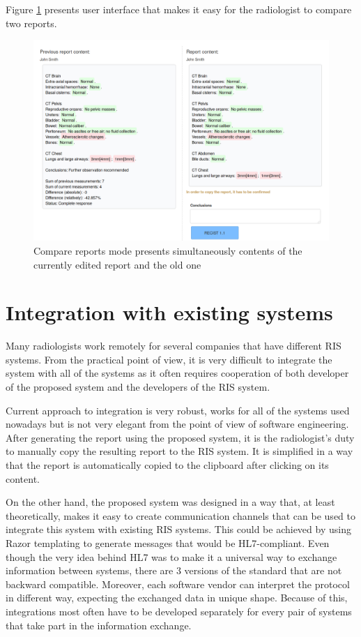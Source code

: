 \documentclass[12pt, twoside, openany]{report}
\theoremstyle{definition}
\begin{document}
Figure \ref{fig:compare-report} presents user interface that makes it easy for the radiologist to compare two reports.

\begin{figure}
	\centering
	\includegraphics[width=\linewidth]{compare-reports}
	\caption{Compare reports mode presents simultaneously contents of the currently edited report and the old one
		\label{fig:compare-report}
	}
\end{figure}

\section{Integration with existing systems}
Many radiologists work remotely for several companies that have different RIS systems. From the practical point of view, it is very difficult to integrate the system with all of the systems as it often requires cooperation of both developer of the proposed system and the developers of the RIS system. 

Current approach to integration is very robust, works for all of the systems used nowadays but is not very elegant from the point of view of software engineering. 
After generating the report using the proposed system, it is the radiologist's duty to manually copy the resulting report to the RIS system. It is simplified in a way that the report is automatically copied to the clipboard after clicking on its content.

On the other hand, the proposed system was designed in a way that, at least theoretically, makes it easy to create communication channels that can be used to integrate this system with existing RIS systems. This could be achieved by using Razor templating to generate messages that would be HL7-compliant. Even though the very idea behind HL7 was to make it a universal way to exchange information between systems, there are 3 versions of the standard that are not backward compatible. Moreover, each software vendor can interpret the protocol in different way, expecting the exchanged data in unique shape. Because of this, integrations most often have to be developed separately for every pair of systems that take part in the information exchange.
\end{document}
